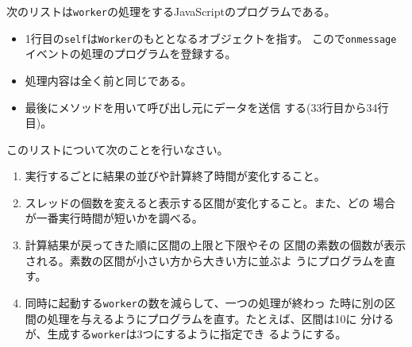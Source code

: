 \begin{Exec}
 次のリストは\Verb+worker+の処理をするJavaScriptのプログラムである。
 \begin{itemize}
  \item 1行目の\Verb+self+は\Verb+Worker+のもととなるオブジェクトを指す。
        こので\Verb+onmessage+イベントの処理のプログラムを登録する。
  \item 処理内容は全く前と同じである。
  \item 最後にメソッドを用いて呼び出し元にデータを送信
        する(33行目から34行目)。
 \end{itemize}
\end{Exec}
 \begin{Prob}このリストについて次のことを行いなさい。
  \begin{enumerate}
   \item 実行するごとに結果の並びや計算終了時間が変化すること。
   \item スレッドの個数を変えると表示する区間が変化すること。また、どの
         場合が一番実行時間が短いかを調べる。
   \item 計算結果が戻ってきた順に区間の上限と下限やその
 区間の素数の個数が表示される。素数の区間が小さい方から大きい方に並ぶよ
 うにプログラムを直す。
   \item 同時に起動する\texttt{worker}の数を減らして、一つの処理が終わっ
         た時に別の区間の処理を与えるようにプログラムを直す。たとえば、区間は10に
         分けるが、生成する\texttt{worker}は3つにするように指定でき
         るようにする。
  \end{enumerate} 
 \end{Prob}